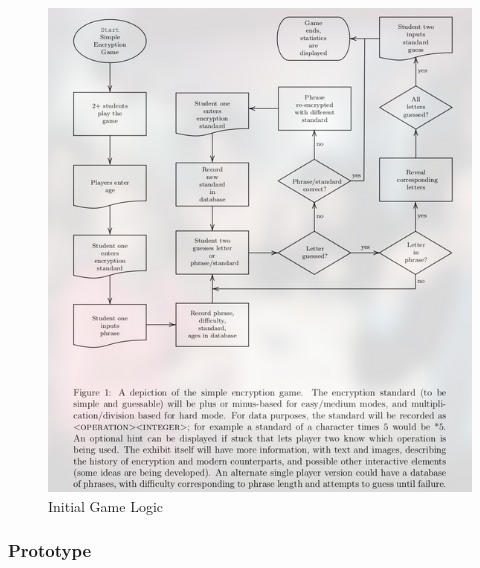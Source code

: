 \documentclass[conference]{IEEEtran}
\begin{document}
\begin{figure}[H]
  \centering
  \includegraphics[width=.45\textwidth]{Figures/initLogic.png}
  \caption{Initial Game Logic}
\end{figure}

\subsubsection{Prototype}
\end{document}
